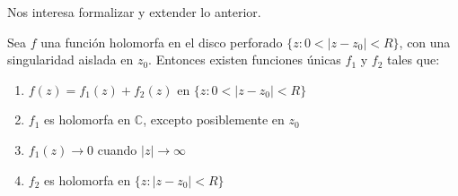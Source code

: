   Nos interesa formalizar y extender lo anterior.
  \begin{theorem}
    \label{theo:complex-f1+f2-singularity}
    Sea \(f\) una función holomorfa
    en el disco perforado
      \(\{ z \colon 0 < \lvert z - z_0 \rvert < R \}\),
    con una singularidad aislada en \(z_0\).
    Entonces existen funciones únicas \(f_1\) y \(f_2\) tales que:
    \begin{enumerate}[label=(\alph*), ref=(\alph*)]
    \item
      \label{theo:complex-f1+f2-singularity:a}
      \(f(z) = f_1(z) + f_2(z)\)
      en \(\{ z \colon 0 < \lvert z - z_0 \rvert < R \}\)
    \item
      \label{theo:complex-f1+f2-singularity:b}
      \(f_1\) es holomorfa en \(\mathbb{C}\),
      excepto posiblemente en \(z_0\)
    \item
      \label{theo:complex-f1+f2-singularity:c}
      \(f_1(z) \rightarrow 0\)
	 cuando \(\lvert z \rvert \rightarrow \infty\)
    \item
      \label{theo:complex-f1+f2-singularity:d}
      \(f_2\) es holomorfa
	 en \(\{ z \colon \lvert z - z_0 \rvert < R \}\)
    \end{enumerate}
  \end{theorem}
